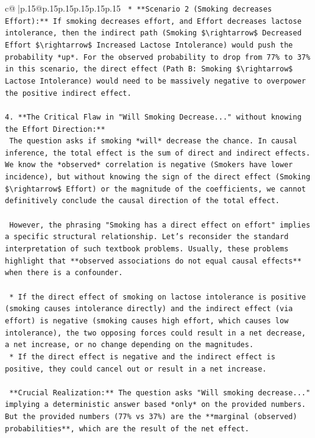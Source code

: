 \documentclass{article}
\begin{document}
{\begin{supertabular}{c@{$\;$}|p{.15\linewidth}@{}p{.15\linewidth}p{.15\linewidth}p{.15\linewidth}p{.15\linewidth}p{.15\linewidth}}
{{{\texttt{    *   **Scenario 2 (Smoking decreases Effort):** If smoking decreases effort, and Effort decreases lactose intolerance, then the indirect path (Smoking \$\textbackslash{}rightarrow\$ Decreased Effort \$\textbackslash{}rightarrow\$ Increased Lactose Intolerance) would push the probability *up*. For the observed probability to drop from 77\% to 37\% in this scenario, the direct effect (Path B: Smoking \$\textbackslash{}rightarrow\$ Lactose Intolerance) would need to be massively negative to overpower the positive indirect effect.} \\
\\ 
\texttt{4.  **The Critical Flaw in "Will Smoking Decrease..." without knowing the Effort Direction:**} \\
\texttt{    The question asks if smoking *will* decrease the chance. In causal inference, the total effect is the sum of direct and indirect effects. We know the *observed* correlation is negative (Smokers have lower incidence), but without knowing the sign of the direct effect (Smoking \$\textbackslash{}rightarrow\$ Effort) or the magnitude of the coefficients, we cannot definitively conclude the causal direction of the total effect.} \\
\\ 
\texttt{    However, the phrasing "Smoking has a direct effect on effort" implies a specific structural relationship. Let's reconsider the standard interpretation of such textbook problems. Usually, these problems highlight that **observed associations do not equal causal effects** when there is a confounder.} \\
\\ 
\texttt{    *   If the direct effect of smoking on lactose intolerance is positive (smoking causes intolerance directly) and the indirect effect (via effort) is negative (smoking causes high effort, which causes low intolerance), the two opposing forces could result in a net decrease, a net increase, or no change depending on the magnitudes.} \\
\texttt{    *   If the direct effect is negative and the indirect effect is positive, they could cancel out or result in a net increase.} \\
\\ 
\texttt{    **Crucial Realization:** The question asks "Will smoking decrease..." implying a deterministic answer based *only* on the provided numbers. But the provided numbers (77\% vs 37\%) are the **marginal (observed) probabilities**, which are the result of the net effect.} \\
}}}
\end{supertabular}}
\end{document}
